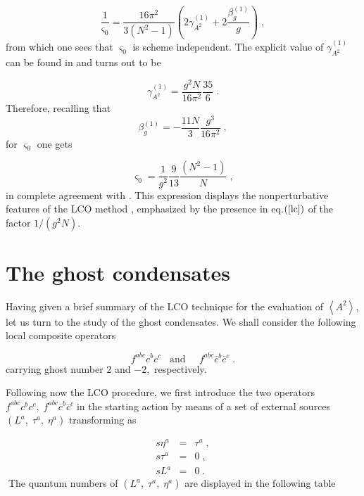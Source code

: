 \documentclass[a4paper,12pt]{article}
\begin{document}
\begin{equation}
\frac{1}{\varsigma _{0}}=\frac{16\pi ^{2}}{3\left( N^{2}-1\right) }\left(
2\gamma _{A^{2}}^{(1)}+2\frac{\beta _{g}^{(1)}}{g}\right) \;,  \label{ffxi0}
\end{equation}
from which one sees that $\varsigma _{0}$ is scheme independent. The
explicit value of $\gamma _{A^{2}}^{(1)}$ can be found in \cite{v1,gr,dsv}
and turns out to be

\begin{equation}
\gamma _{A^{2}}^{(1)}=\frac{g^{2}N}{16\pi ^{2}}\frac{35}{6}\;.  \label{ga}
\end{equation}
Therefore, recalling that 
\begin{equation}
\beta _{g}^{(1)}=-\frac{11N}{3}\frac{g^{3}}{16\pi ^{2}}\;,  \label{betasun}
\end{equation}
for $\varsigma _{0}$ one gets

\begin{equation}
\varsigma _{0}=\frac{1}{g^{2}}\frac{9}{13}\frac{\left( N^{2}-1\right) }{N}\;,
\label{lc}
\end{equation}
in complete agreement with \cite{v1}. This expression displays the
nonperturbative features of the LCO method \cite{v1}, emphasized by the
presence in eq.$\left( \ref{lc}\right) $ of the factor $1/\left(
g^{2}N\right) .$

\section{The ghost condensates}

Having given a brief summary of the LCO technique for the evaluation of $%
\left\langle A^{2}\right\rangle $, let us turn to the study of the ghost
condensates. We shall consider the following local composite operators

\begin{equation}
f^{abc}c^{b}c^{c}\;\;\;\mathrm{and\;\;\;\;\;}f^{abc}\overline{c}^{b}%
\overline{c}^{c}\;.  \label{go}
\end{equation}
carrying ghost number $2$ and $-2,$ respectively.

Following now the LCO procedure, we first introduce the two operators $%
f^{abc}c^{b}c^{c},\mathrm{\;}f^{abc}\overline{c}^{b}\overline{c}^{c}\;$in
the starting action by means of a set of external sources $\left(
L^{a},\;\tau ^{a},\;\eta ^{a}\right) $ transforming as

\begin{eqnarray}
s\eta ^{a} &=&\tau ^{a}\;,  \label{ss} \\
s\tau ^{a} &=&0\;,  \nonumber \\
sL^{a} &=&0\;.  \nonumber
\end{eqnarray}
$\;$The quantum numbers of $\left( L^{a},\;\tau ^{a},\;\eta ^{a}\right) $
are displayed in the following table
\end{document}
